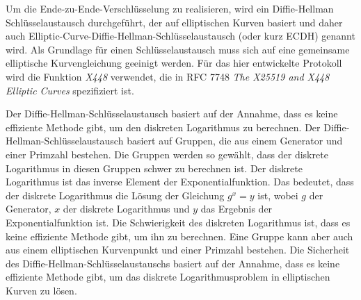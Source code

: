 Um die Ende-zu-Ende-Verschlüsselung zu realisieren, wird ein Diffie-Hellman Schlüsselaustausch durchgeführt, der auf elliptischen Kurven basiert und daher auch Elliptic-Curve-Diffie-Hellman-Schlüsselaustausch (oder kurz ECDH) genannt wird. Als Grundlage für einen Schlüsselaustausch muss sich auf eine gemeinsame elliptische Kurvengleichung geeinigt werden. Für das hier entwickelte Protokoll wird die Funktion \textit{X448} verwendet, die in RFC 7748 \textit{The X25519 and X448 Elliptic Curves} \parencite{rfc_ellipticCurves} spezifiziert ist.



Der Diffie-Hellman-Schlüsselaustausch basiert auf der Annahme, dass es keine effiziente Methode gibt, um den diskreten Logarithmus zu berechnen. Der Diffie-Hellman-Schlüsselaustausch basiert auf Gruppen, die aus einem Generator und einer Primzahl bestehen. Die Gruppen werden so gewählt, dass der diskrete Logarithmus in diesen Gruppen schwer zu berechnen ist. Der diskrete Logarithmus ist das inverse Element der Exponentialfunktion. Das bedeutet, dass der diskrete Logarithmus die Lösung der Gleichung $g^x = y$ ist, wobei $g$ der Generator, $x$ der diskrete Logarithmus und $y$ das Ergebnis der Exponentialfunktion ist. Die Schwierigkeit des diskreten Logarithmus ist, dass es keine effiziente Methode gibt, um ihn zu berechnen. Eine Gruppe kann aber auch aus einem elliptischen Kurvenpunkt und einer Primzahl bestehen. Die Sicherheit des Diffie-Hellman-Schlüsselaustauschs basiert auf der Annahme, dass es keine effiziente Methode gibt, um das diskrete Logarithmusproblem in elliptischen Kurven zu lösen.




